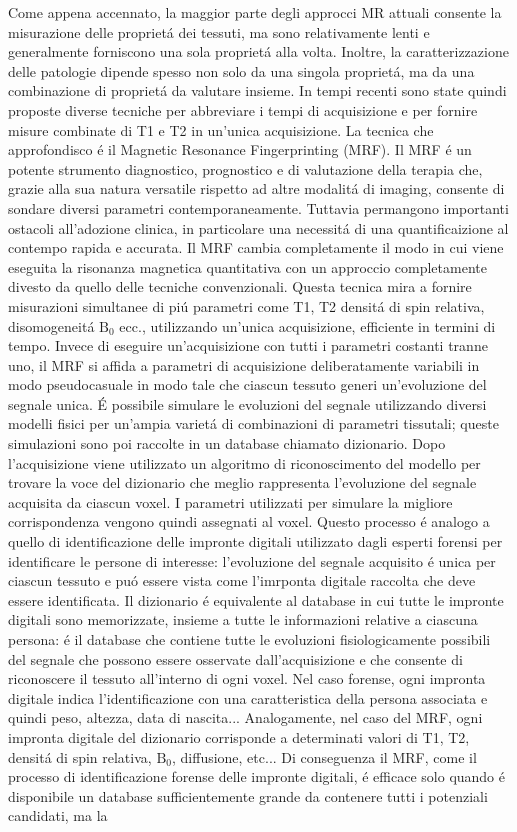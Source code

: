 \documentclass[a4paper,10pt]{article}
\begin{document}
 Come appena accennato, la maggior parte degli approcci MR attuali consente la misurazione delle propriet\'a dei tessuti, ma sono relativamente lenti e generalmente forniscono una sola propriet\'a alla volta. Inoltre, la caratterizzazione delle patologie dipende spesso non solo da una singola propriet\'a, ma da una combinazione di propriet\'a da valutare insieme. In tempi recenti sono state quindi proposte diverse tecniche per abbreviare i tempi di acquisizione e per fornire misure combinate di T1 e T2 in un'unica acquisizione. La tecnica che approfondisco \'e il Magnetic Resonance Fingerprinting (MRF). Il MRF \'e un potente strumento diagnostico, prognostico e di valutazione della terapia che, grazie alla sua natura versatile rispetto ad altre modalit\'a di imaging, consente di sondare diversi parametri contemporaneamente. Tuttavia permangono importanti ostacoli all'adozione clinica, in particolare una necessit\'a di una quantificaizione al contempo rapida e accurata. Il MRF cambia completamente il modo in cui viene eseguita la risonanza magnetica quantitativa con un approccio completamente divesto da quello delle tecniche convenzionali. Questa tecnica mira a fornire misurazioni simultanee di pi\'u parametri come T1, T2 densit\'a di spin relativa, disomogeneit\'a $\mbox{B}_0$ ecc., utilizzando un'unica acquisizione, efficiente in termini di tempo. Invece di eseguire un'acquisizione con tutti i parametri costanti tranne uno, il MRF si affida a parametri di acquisizione deliberatamente variabili in modo pseudocasuale in modo tale che ciascun tessuto generi un'evoluzione del segnale unica. \'E possibile simulare le evoluzioni del segnale utilizzando diversi modelli fisici per un'ampia variet\'a di combinazioni di parametri tissutali; queste simulazioni sono poi raccolte in un database chiamato dizionario. Dopo l'acquisizione viene utilizzato un algoritmo di riconoscimento del modello per trovare la voce del dizionario che meglio rappresenta l'evoluzione del segnale acquisita da ciascun voxel. I parametri utilizzati per simulare la migliore corrispondenza vengono quindi assegnati al voxel. Questo processo \'e analogo a quello di identificazione delle impronte digitali utilizzato dagli esperti forensi per identificare le persone di interesse: l'evoluzione del segnale acquisito \'e unica per ciascun tessuto e pu\'o essere vista come l'imrponta digitale raccolta che deve essere identificata. Il dizionario \'e equivalente al database in cui tutte le impronte digitali sono memorizzate, insieme a tutte le informazioni relative a ciascuna persona: \'e il database che contiene tutte le evoluzioni fisiologicamente possibili del segnale che possono essere osservate dall'acquisizione e che consente di riconoscere il tessuto all'interno di ogni voxel. Nel caso forense, ogni impronta digitale indica l'identificazione con una caratteristica della persona associata e quindi peso, altezza, data di nascita... Analogamente, nel caso del MRF, ogni impronta digitale del dizionario corrisponde a determinati valori di T1, T2, densit\'a di spin relativa, $\mbox{B}_0$, diffusione, etc... Di conseguenza il MRF, come il processo di identificazione forense delle impronte digitali, \'e efficace solo quando \'e disponibile un database sufficientemente grande da contenere tutti i potenziali candidati, ma la 
\end{document}
